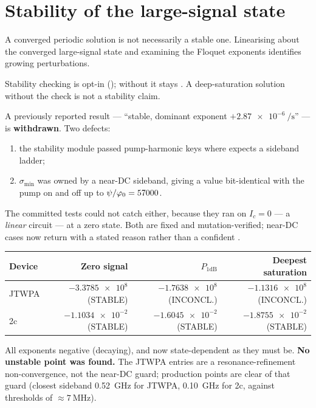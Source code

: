 \section{Stability of the large-signal state}

A converged periodic solution is not necessarily a stable one. Linearising about
the converged large-signal state and examining the Floquet exponents identifies
growing perturbations.

\begin{implnote}
Stability checking is opt-in (); without it
 stays . A deep-saturation solution
without the check is not a stability claim.

A previously reported result --- ``stable, dominant exponent
$+\SI{2.87e-6}{\per\second}$'' --- is \textbf{withdrawn}. Two defects:
\begin{enumerate}
\item the stability module passed pump-harmonic keys where
       expects a sideband ladder;
\item $\sigma_{\min}$ was owned by a near-DC sideband, giving a value
      bit-identical with the pump on and off up to $\psi/\varphi_{0} = 57000$.
\end{enumerate}
The committed tests could not catch either, because they ran on $I_c=0$ --- a
\emph{linear} circuit --- at a zero state. Both are fixed and mutation-verified;
near-DC cases now return  with a stated reason rather than a
confident .
\end{implnote}

\begin{measured}
\begin{center}
\begin{tabular}{@{}l r r r@{}}
\toprule
Device & Zero signal & $P_{1\mathrm{dB}}$ & Deepest saturation \\
\midrule
JTWPA & $-\num{3.3785e8}$ (STABLE) & $-\num{1.7638e8}$ (INCONCL.) & $-\num{1.1316e8}$ (INCONCL.) \\
2c    & $-\num{1.1034e-2}$ (STABLE) & $-\num{1.6045e-2}$ (STABLE) & $-\num{1.8755e-2}$ (STABLE) \\
\bottomrule
\end{tabular}
\end{center}
All exponents negative (decaying), and now state-dependent as they must be.
\textbf{No unstable point was found.} The JTWPA  entries are
a resonance-refinement non-convergence, not the near-DC guard; production points
are clear of that guard (closest sideband \SI{0.52}{\giga\hertz} for JTWPA,
\SI{0.10}{\giga\hertz} for 2c, against thresholds of $\approx\SI{7}{\mega\hertz}$).
\end{measured}

